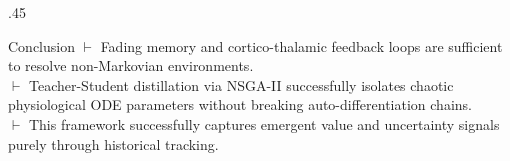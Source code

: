 \documentclass[final]{beamer}
\begin{document}
\begin{frame}[fragile,t]
\begin{columns}[T]
\begin{column}{.45\textwidth}
      \begin{block}{Conclusion}
        $\vdash$ Fading memory and cortico-thalamic feedback loops are sufficient to resolve non-Markovian environments. \\
        \vspace{0.2em}
        $\vdash$ Teacher-Student distillation via NSGA-II successfully isolates chaotic physiological ODE parameters without breaking auto-differentiation chains. \\
        \vspace{0.2em}
        $\vdash$ This framework successfully captures emergent value and uncertainty signals purely through historical tracking.
      \end{block}


    \end{column}
  \end{columns}
\end{frame}
\end{document}

